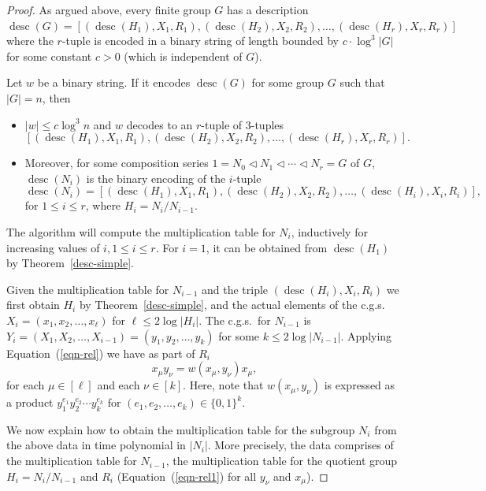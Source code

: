 \documentclass{elsarticle}
\newcommand{\desc}{\mathop{\mathrm{desc}}}
\begin{document}
\begin{proof}
  As argued above, every finite group $G$ has a description
  $\desc(G) =
  [(\desc(H_1),X_1,R_1),(\desc(H_2),X_2,R_2),\ldots,(\desc(H_r),X_r,R_r)]$
  where the $r$-tuple is encoded in a binary string of length bounded
  by $c\cdot \log^3|G|$ for some constant $c>0$ (which is independent
  of $G$).

  Let $w$ be a binary string. If it encodes $\desc(G)$ for some group
  $G$ such that $|G|=n$, then
\begin{itemize}
\item  $|w|\le c\log^3 n$ and $w$ decodes to an $r$-tuple of $3$-tuples
 \[[(\desc(H_1),X_1,R_1),(\desc(H_2),X_2,R_2),\ldots,(\desc(H_r),X_r,R_r)].\]
\item Moreover, for some composition series
  $1=N_0\lhd N_1\lhd \cdots \lhd N_r=G$ of $G$,
  $\desc(N_i)$ is the binary encoding of the $i$-tuple
  \[
    \desc(N_i) =
    [(\desc(H_1),X_1,R_1),(\desc(H_2),X_2,R_2),\ldots,(\desc(H_i),X_i,R_i)],
  \]
  for $1\le i\le r$, where $H_i=N_i/N_{i-1}$.
\end{itemize}

  The algorithm will compute the multiplication table for $N_i$,
  inductively for increasing values of $i, 1\le i\le r$. For $i=1$,
  it can be obtained from $\desc(H_1)$ by Theorem~\ref{desc-simple}.

  Given the multiplication table for $N_{i-1}$ and the triple
  $(\desc(H_i),X_i,R_i)$ we first obtain $H_i$ by
  Theorem~\ref{desc-simple}, and the actual elements of the c.g.s.\
  $X_i=(x_1,x_2,\ldots,x_\ell)$ for $\ell\le 2\log |H_i|$. The c.g.s.\
  for $N_{i-1}$ is $Y_i=(X_1,X_2,\ldots,X_{i-1})=(y_1,y_2,\ldots,y_k)$
  for some $k\le 2\log |N_{i-1}|$. Applying Equation~(\ref{eqn-rel}) we
  have as part of $R_i$
  \begin{equation}\label{eqn-rel1}
    x_\mu y_\nu=w(x_\mu,y_\nu)x_\mu,
  \end{equation}
  for each $\mu\in [\ell]$ and each $\nu\in [k]$. Here, note that
  $w(x_\mu,y_\nu)$ is expressed as a product $y_1^{e_1}y_2^{e_2}\cdots
  y_k^{e_k}$ for $(e_1,e_2,\ldots,e_k) \in \{0,1\}^k$.

  We now explain how to obtain the multiplication table for the
  subgroup $N_i$ from the above data in time polynomial in $|N_i|$.
  More precisely, the data comprises of the multiplication table for
  $N_{i-1}$, the multiplication table for the quotient group
  $H_i=N_i/N_{i-1}$ and $R_i$ (Equation~(\ref{eqn-rel1}) for all $y_\nu$
  and $x_\mu$).


\end{proof}
\end{document}

